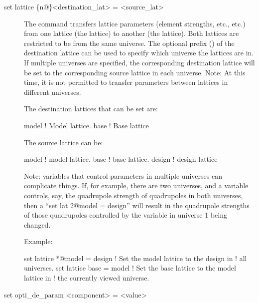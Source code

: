 {{\begin{description}

\item[set lattice \{n@\}<destination\_lat> = <source\_lat>] \Newline

\vskip -0.2in

The  command transfers lattice parameters (element
strengths, etc., etc.) from one lattice (the  lattice) to
another (the  lattice). Both lattices are restricted
to be from the same universe. The optional  prefix
() of the destination lattice can be used to specify
which universe the lattices are in. If multiple universes are
specified, the corresponding destination lattice will be set to the
corresponding source lattice in each universe. Note: At this time, it
is not permitted to transfer parameters between lattices in different
universes.

The destination lattices that can be set are:
\begin{example}
  model      ! Model lattice.
  base       ! Base lattice
\end{example}
The source lattice can be:
\begin{example}
  model       ! model lattice.
  base        ! base lattice.
  design      ! design lattice
\end{example}

Note: \tao variables that control parameters in multiple universes can
complicate things. If, for example, there are two universes, and a
\tao variable controls, say, the quadrupole strength of quadrupoles in
both universes, then a ``set lat 2@model = design'' will result in the
quadrupole strengths of those quadrupoles controlled by the variable
in universe 1 being changed.

Example:
\begin{example}
  set lattice *@model = design  ! Set the model lattice to the design in 
                                !   all universes.
  set lattice base = model      ! Set the base lattice to the model lattice in 
                                !   the currently viewed universe.
\end{example}


\item[set opti_de_param <component> = <value>] \Newline

\vskip -0.2in


\end{description}}}
